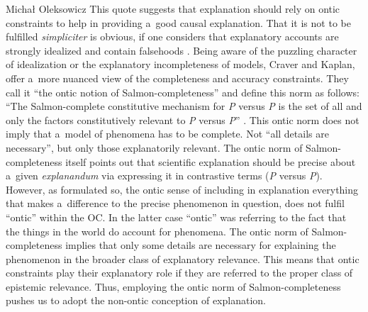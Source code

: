 \begin{artengenv}{Michał Oleksowicz}
This quote suggests that explanation should rely on ontic constraints to help in providing a~good causal explanation. That it is not to be fulfilled \textit{simpliciter} is obvious, if one considers that explanatory accounts are strongly idealized and contain falsehoods
\parencite[][]{potochnik_idealization_2017}. %
 Being aware of the puzzling character of idealization or the explanatory incompleteness of models, Craver and Kaplan, offer a~more nuanced view of the completeness and accuracy constraints. They call it ``the ontic notion of Salmon-completeness'' and define this norm as follows: ``The Salmon-complete constitutive mechanism for \textit{P} versus \textit{P{\textasciigrave}} is the set of all and only the factors constitutively relevant to \textit{P} versus \textit{P{\textasciigrave}}'' 
\parencite[][p.300]{craver_are_2020}. %
 This ontic norm does not imply that a~model of phenomena has to be complete. Not ``all details are necessary'', but only those explanatorily relevant. The ontic norm of Salmon-completeness itself points out that scientific explanation should be precise about a~given \textit{explanandum} via expressing it in contrastive terms (\textit{P} versus \textit{P{\textasciigrave}}). However, as formulated so, the ontic sense of including in explanation everything that makes a~difference to the precise phenomenon in question, does not fulfil ``ontic'' within the OC. In the latter case ``ontic'' was referring to the fact that the things in the world do account for phenomena. The ontic norm of Salmon-completeness implies that only some details are necessary for explaining the phenomenon in the broader class of explanatory relevance. This means that ontic constraints play their explanatory role if they are referred to the proper class of epistemic relevance. Thus, employing the ontic norm of Salmon-completeness pushes us to adopt the non-ontic conception of explanation.


\end{artengenv}
